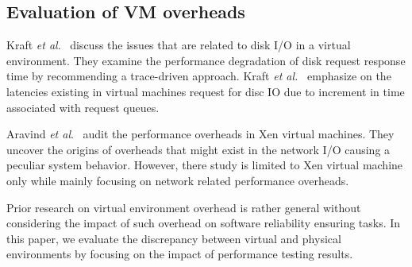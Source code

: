 \subsection{Evaluation of VM overheads}

Kraft \textit{et al$.$}~\cite{kraft2011io} discuss the issues that are related to disk I/O in a virtual environment. They examine the performance degradation of disk request response time by recommending a trace-driven approach. Kraft \textit{et al.}~\cite{kraft2011io} emphasize on the latencies existing in virtual machines request for disc IO due to increment in time associated with request queues. 

Aravind \textit{et al$.$}~\cite{menon2005diagnosing} audit the performance overheads in Xen virtual machines. They uncover the origins of overheads that might exist in the network I/O causing a peculiar system behavior. However, there study is limited to Xen virtual machine only while mainly focusing on network related performance overheads.

Prior research on virtual environment overhead is rather general without considering the impact of such overhead on software reliability ensuring tasks. In this paper, we evaluate the discrepancy between virtual and physical environments by focusing on the impact of performance testing results. 


